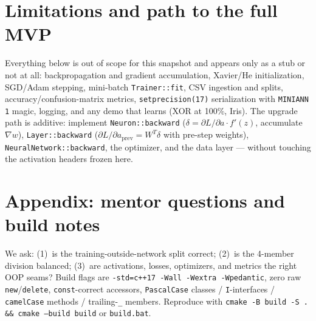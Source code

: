 \documentclass[11pt,a4paper]{article}
\begin{document}
\section{Limitations and path to the full MVP}
Everything below is out of scope for this snapshot and appears only as a stub or not at all:
backpropagation and gradient accumulation, Xavier/He initialization, SGD/Adam stepping,
mini-batch \texttt{Trainer::fit}, CSV ingestion and splits, accuracy/confusion-matrix metrics,
\texttt{setprecision(17)} serialization with \texttt{MINIANN 1} magic, logging, and any demo that
learns (XOR at 100\%, Iris). The upgrade path is additive: implement \texttt{Neuron::backward}
($\delta = \partial L/\partial a\cdot f'(z)$, accumulate $\nabla w$), \texttt{Layer::backward}
($\partial L/\partial a_{\mathrm{prev}} = W^T\delta$ with pre-step weights),
\texttt{NeuralNetwork::backward}, the optimizer, and the data layer --- without touching the
activation headers frozen here.

\section{Appendix: mentor questions and build notes}
We ask: (1)~is the training-outside-network split correct; (2)~is the 4-member division
balanced; (3)~are activations, losses, optimizers, and metrics the right OOP seams? Build flags
are \texttt{-std=c++17 -Wall -Wextra -Wpedantic}, zero raw \texttt{new}/\texttt{delete},
\texttt{const}-correct accessors, \texttt{PascalCase} classes / \texttt{I}-interfaces /
\texttt{camelCase} methods / trailing-\texttt{\_} members. Reproduce with
\texttt{cmake -B build -S . \&\& cmake --build build} or \texttt{build.bat}.
\end{document}
